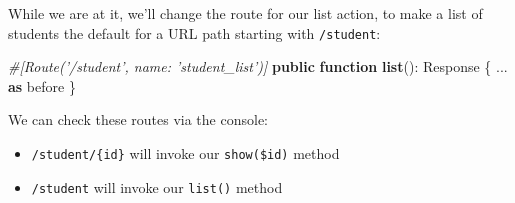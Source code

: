 \documentclass[a4paperpaper,openright]{book}
\newenvironment{Shaded}{}{}
\newcommand{\CommentTok}[1]{\textcolor[rgb]{0.38,0.63,0.69}{\textit{#1}}}
\newcommand{\KeywordTok}[1]{\textcolor[rgb]{0.00,0.44,0.13}{\textbf{#1}}}
\newcommand{\NormalTok}[1]{#1}
\newcommand{\OtherTok}[1]{\textcolor[rgb]{0.00,0.44,0.13}{#1}}
\newcommand{\StringTok}[1]{\textcolor[rgb]{0.25,0.44,0.63}{#1}}
\providecommand{\tightlist}{%
  \setlength{\itemsep}{0pt}\setlength{\parskip}{0pt}}
\begin{document}
\begin{Shaded}
\end{Shaded}

While we are at it, we'll change the route for our list action, to make
a list of students the default for a URL path starting with
\texttt{/student}:

\begin{Shaded}
\begin{Highlighting}[]
  \CommentTok{#[Route('/student', name: 'student_list')]}
  \KeywordTok{public} \KeywordTok{function} \KeywordTok{list}\OtherTok{()}\NormalTok{: Response}
\NormalTok{  \{}
      \StringTok{...} \KeywordTok{as}\NormalTok{ before}
\NormalTok{  \}}
\end{Highlighting}
\end{Shaded}

We can check these routes via the console:

\begin{itemize}
\tightlist
\item
  \texttt{/student/\{id\}} will invoke our \texttt{show(\$id)} method
\item
  \texttt{/student} will invoke our \texttt{list()} method
\end{itemize}
\end{document}
